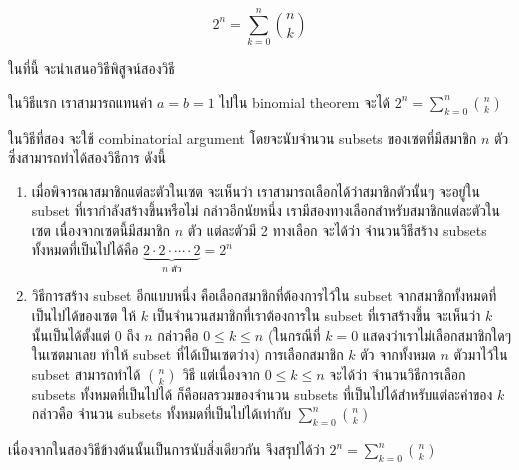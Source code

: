 \begin{corollary}
\[2^n=\sum_{k=0}^{n}{\binom{n}{k}}\]
\begin{pf}
ในที่นี้ จะนำเสนอวิธีพิสูจน์สองวิธี

ในวิธีแรก เราสามารถแทนค่า $a=b=1$ ไปใน binomial theorem จะได้ $2^n=\sum_{k=0}^{n}{\binom{n}{k}}$

ในวิธีที่สอง จะใช้ combinatorial argument โดยจะนับจำนวน subsets ของเซตที่มีสมาชิก $n$ ตัว ซึ่งสามารถทำได้สองวิธีการ ดังนี้
\begin{enumerate}[]
\item เมื่อพิจารณาสมาชิกแต่ละตัวในเซต จะเห็นว่า เราสามารถเลือกได้ว่าสมาชิกตัวนั้นๆ จะอยู่ใน subset ที่เรากำลังสร้างขึ้นหรือไม่ \enskip กล่าวอีกนัยหนึ่ง เรามีสองทางเลือกสำหรับสมาชิกแต่ละตัวในเซต \enskip เนื่องจากเซตนี้มีสมาชิก $n$ ตัว แต่ละตัวมี 2 ทางเลือก จะได้ว่า จำนวนวิธีสร้าง subsets ทั้งหมดที่เป็นไปได้คือ $\underbrace{2\cdot 2\cdot\cdots\cdot 2}_{\text{$n$ ตัว}}=2^n$
\item วิธีการสร้าง subset อีกแบบหนึ่ง คือเลือกสมาชิกที่ต้องการไว้ใน subset จากสมาชิกทั้งหมดที่เป็นไปได้ของเซต \enskip ให้ $k$ เป็นจำนวนสมาชิกที่เราต้องการใน subset ที่เราสร้างขึ้น \enskip จะเห็นว่า $k$ นั้นเป็นได้ตั้งแต่ 0 ถึง $n$ กล่าวคือ $0\leq k\leq n$ (ในกรณีที่ $k=0$ แสดงว่าเราไม่เลือกสมาชิกใดๆ ในเซตมาเลย ทำให้ subset ที่ได้เป็นเซตว่าง) \enskip การเลือกสมาชิก $k$ ตัว จากทั้งหมด $n$ ตัวมาไว้ใน subset สามารถทำได้ $\binom{n}{k}$ วิธี \enskip แต่เนื่องจาก $0\leq k\leq n$ จะได้ว่า จำนวนวิธีการเลือก subsets ทั้งหมดที่เป็นไปได้ ก็คือผลรวมของจำนวน subsets ที่เป็นไปได้สำหรับแต่ละค่าของ $k$ กล่าวคือ จำนวน subsets ทั้งหมดที่เป็นไปได้เท่ากับ $\sum_{k=0}^{n}{\binom{n}{k}}$
\end{enumerate}
เนื่องจากในสองวิธีข้างต้นนั้นเป็นการนับสิ่งเดียวกัน จึงสรุปได้ว่า $2^n=\sum_{k=0}^{n}{\binom{n}{k}}$
\end{pf}
\end{corollary}
